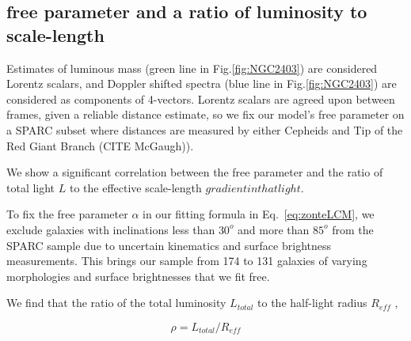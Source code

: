 \documentclass[reprint,%
 amsmath,amssymb,
 aps,
]{revtex4-1}
\begin{document}
\subsection{  free parameter and a ratio of luminosity to scale-length}
 
  
Estimates of luminous mass  (green line in Fig.\ref{fig:NGC2403})   are   considered Lorentz scalars, 
and Doppler shifted spectra (blue line in Fig.\ref{fig:NGC2403})  are considered as components of 4-vectors. Lorentz scalars  are agreed upon between frames, given a reliable distance estimate, so we   fix our model's free parameter on a SPARC subset where distances are measured by either   Cepheids and Tip of the Red Giant Branch (CITE McGaugh)).  
 

 We show a significant  correlation between the free parameter and the ratio of total light $L$ to the effective scale-length $gradient in that light$. 
 
 

 
   
 
 
 
 


 
  
  
 

 
 
 
   
 
 
    
To fix the free parameter $\alpha$ in  our fitting formula in Eq.~\ref{eq:zonteLCM}, we exclude galaxies with inclinations less than $30^o$ and more than $85^o$ from the SPARC sample due to uncertain kinematics and surface brightness measurements. This brings our sample from 174 to 131 galaxies of varying morphologies and surface brightnesses \cite{2016Lelli} that   we fit free.

 We find that the ratio of the total luminosity $L_{total}$ to    the half-light radius $R_{eff}$ \cite{Lelli_2016surface},  
 
 \begin{equation}
     \rho = L_{total}/R_{eff}
 \end{equation}
 
\end{document}

